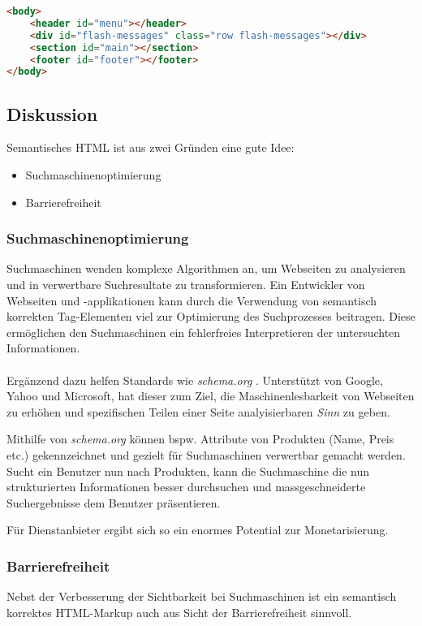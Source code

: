 \begin{lstlisting}[language=HTML, caption=Layout Definition \cite{roomiesHtmlSkeleton}, label=lst:layoutDefinition, firstnumber=27]
<body>
	<header id="menu"></header>
	<div id="flash-messages" class="row flash-messages"></div>
	<section id="main"></section>
	<footer id="footer"></footer>
</body>
\end{lstlisting}

\subsection*{Diskussion}
Semantisches HTML ist aus zwei Gründen eine gute Idee:
\begin{itemize}
	\item Suchmaschinenoptimierung
	\item Barrierefreiheit
\end{itemize}

\subsubsection*{Suchmaschinenoptimierung}
Suchmaschinen wenden komplexe Algorithmen an, um Webseiten zu analysieren und in verwertbare Suchresultate zu transformieren. Ein Entwickler von Webseiten und -applikationen kann durch die Verwendung von semantisch korrekten Tag-Elementen viel zur Optimierung des Suchprozesses beitragen. Diese ermöglichen den Suchmaschinen ein fehlerfreies Interpretieren der untersuchten Informationen.
\\ \\
Ergänzend dazu helfen Standards wie \emph{schema.org} \cite{SchemaOrg}. Unterstützt von Google, Yahoo und Microsoft, hat dieser zum Ziel, die Maschinenlesbarkeit von Webseiten zu erhöhen und spezifischen Teilen einer Seite analyisierbaren \emph{Sinn} zu geben.

Mithilfe von \emph{schema.org} können bspw. Attribute von Produkten (Name, Preis etc.) gekennzeichnet und gezielt für Suchmaschinen verwertbar gemacht werden. Sucht ein Benutzer nun nach Produkten, kann die Suchmaschine die nun strukturierten Informationen besser durchsuchen und massgeschneiderte Suchergebnisse dem Benutzer präsentieren.

Für Dienstanbieter ergibt sich so ein enormes Potential zur Monetarisierung.

\subsubsection*{Barrierefreiheit}
Nebst der Verbesserung der Sichtbarkeit bei Suchmaschinen ist ein semantisch korrektes HTML-Markup auch aus Sicht der Barrierefreiheit sinnvoll.


